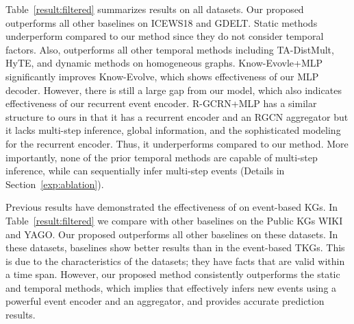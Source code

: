 Table~\ref{result:filtered} summarizes results on all datasets. 
Our proposed \method outperforms all other baselines on ICEWS18 and GDELT.
Static methods underperform compared to our method since they do not consider temporal factors.
Also, \method outperforms all other temporal methods including TA-DistMult, HyTE, and dynamic methods on homogeneous graphs.
Know-Evovle+MLP significantly improves Know-Evolve, which shows effectiveness of our MLP decoder.
However, there is still a large gap from our model, which also indicates effectiveness of our recurrent event encoder. 
R-GCRN+MLP has a similar structure to ours in that it has a recurrent encoder and an RGCN aggregator but it lacks multi-step inference, global information, and the sophisticated modeling for the recurrent encoder. Thus, it underperforms compared to our method.
More importantly, none of the prior temporal methods are capable of multi-step inference, while \method can sequentially infer multi-step events (Details in Section~\ref{exp:ablation}).






Previous results have demonstrated the effectiveness of \method on event-based KGs. In Table~\ref{result:filtered} we compare \method with other baselines on the Public KGs  WIKI and YAGO.
Our proposed \method outperforms all other baselines on these datasets. 
In these datasets, baselines show better results than in the event-based TKGs.
This is due to the characteristics of the datasets; they have facts that are valid within a time span. 
However, our proposed method consistently outperforms the static and temporal methods, which implies that \method effectively infers new events using a powerful event encoder and an aggregator, and provides accurate prediction results.



